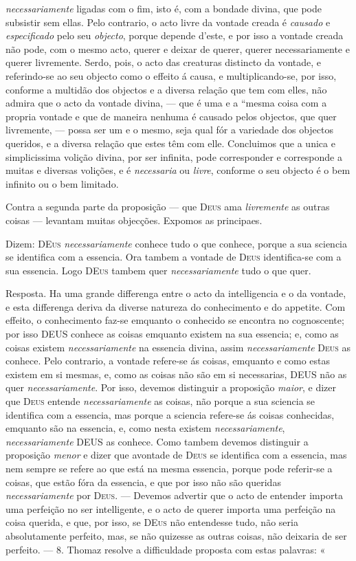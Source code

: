 \emph{necessariamente} ligadas com o fim, isto é, com a bondade divina, que pode subsistir sem ellas. Pelo contrario, o acto livre da vontade creada é \emph{causado} e \emph{especificado} pelo seu \emph{objecto}, porque depende d'este, e por isso a vontade creada não pode, com o mesmo acto, querer e deixar de querer, querer necessariamente e querer livremente. Serdo, pois, o acto das creaturas distincto da vontade, e referindo-se ao seu objecto como o effeito á causa, e multiplicando-se, por isso, conforme a multidão dos objectos e a diversa relação que tem com elles, não admira que o acto da vontade divina, --- que é uma e a “mesma coisa com a propria vontade e que de maneira nenhuma é causado pelos objectos, que quer livremente, --- possa ser um e o mesmo, seja qual fór a variedade dos objectos queridos, e a diversa relação que estes têm com elle. Concluimos que a unica e simplicissima volição divina, por ser infinita, pode corresponder e corresponde a muitas e diversas volições, e é \emph{necessaria} ou \emph{livre}, conforme o seu objecto é o bem infinito ou o bem limitado.\par Contra a segunda parte da proposição --- que \textsc{Deus} ama \emph{livremente} as outras coisas --- levantam muitas objecções. Expomos as principaes.\par Dizem: \textsc{DEus} \emph{necessariamente} conhece tudo o que conhece, porque a sua sciencia se identifica com a essencia. Ora tambem a vontade de \textsc{Deus} identifica-se com a sua essencia. Logo \textsc{DEus} tambem quer \emph{necessariamente} tudo o que quer.\par Resposta. Ha uma grande differenga entre o acto da intelligencia e o da vontade, e esta differenga deriva da diverse natureza do conhecimento e do appetite. Com effeito, o conhecimento faz-se emquanto o conhecido se encontra no cognoscente; por isso \textsc{DEUS} conhece as coisas emquanto existem na sua essencia; e, como as coisas existem \emph{necessariamente} na essencia divina, assim \emph{necessariamente} \textsc{Deus} as conhece. Pelo contrario, a vontade refere-se ás coisas, emquanto e como estas existem em si mesmas, e, como as coisas não são em si necessarias, \textsc{DEUS} não as quer \emph{necessariamente}. Por isso, devemos distinguir a proposição \emph{maior}, e dizer que \textsc{Deus} entende \emph{necessariamente} as coisas, não porque a sua sciencia se identifica com a essencia, mas porque a sciencia refere-se ás coisas conhecidas, emquanto são na essencia, e, como nesta existem \emph{necessariamente}, \emph{necessariamente} \textsc{DEUS} as conhece. Como tambem devemos distinguir a proposição \emph{menor} e dizer que avontade de \textsc{Deus} se identifica com a essencia, mas nem sempre se refere ao que está na mesma essencia, porque pode referir-se a coisas, que estão fóra da essencia, e que por isso não são queridas \emph{necessariamente} por \textsc{Deus}. --- Devemos advertir que o acto de entender importa uma perfeição no ser intelligente, e o acto de querer importa uma perfeição na coisa querida, e que, por isso, se \textsc{DEus} não entendesse tudo, não seria absolutamente perfeito, mas, se não quizesse as outras coisas, não deixaria de ser perfeito. --- 8. Thomaz resolve a difficuldade proposta com estas palavras: « 